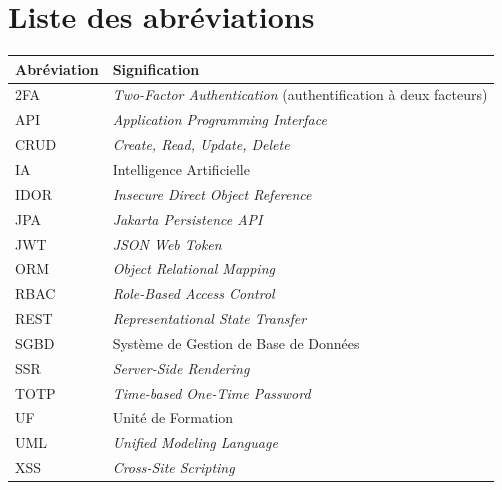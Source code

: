 \documentclass[12pt,a4paper,oneside]{report}
\begin{document}
\clearpage
\chapter*{Liste des abréviations}

\begin{longtable}{|p{3cm}|p{11cm}|}
\toprule
\textbf{Abréviation} & \textbf{Signification} \\
\midrule
\endhead
2FA   & \textit{Two-Factor Authentication} (authentification à deux facteurs) \\ \hline
API   & \textit{Application Programming Interface} \\ \hline
CRUD  & \textit{Create, Read, Update, Delete} \\ \hline
IA    & Intelligence Artificielle \\ \hline
IDOR  & \textit{Insecure Direct Object Reference} \\ \hline
JPA   & \textit{Jakarta Persistence API} \\ \hline
JWT   & \textit{JSON Web Token} \\ \hline
ORM   & \textit{Object Relational Mapping} \\ \hline
RBAC  & \textit{Role-Based Access Control} \\ \hline
REST  & \textit{Representational State Transfer} \\ \hline
SGBD  & Système de Gestion de Base de Données \\ \hline
SSR   & \textit{Server-Side Rendering} \\ \hline
TOTP  & \textit{Time-based One-Time Password} \\ \hline
UF    & Unité de Formation \\ \hline
UML   & \textit{Unified Modeling Language} \\ \hline
XSS   & \textit{Cross-Site Scripting} \\
\bottomrule
\end{longtable}

\clearpage
\renewcommand{\contentsname}{Table des matières}
\tableofcontents
{}

\clearpage
\listoffigures
{}

\clearpage
\listoftables
{}
\end{document}
